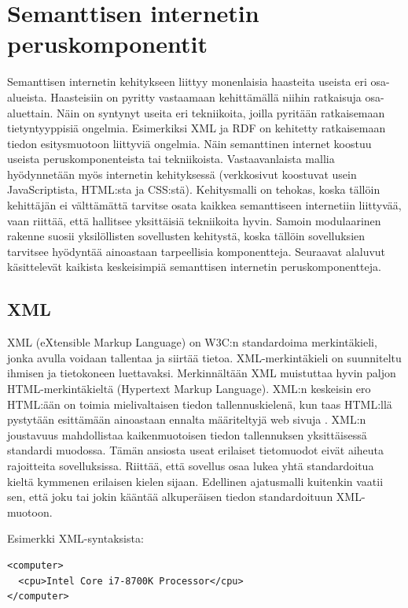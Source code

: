 \documentclass[finnish, 12pt, a4paper, elec, utf8, pdfa, online]{aaltothesis}
\begin{document}
\section{Semanttisen internetin peruskomponentit}
Semanttisen internetin kehitykseen liittyy monenlaisia haasteita useista eri osa-alueista. Haasteisiin on pyritty vastaamaan kehittämällä niihin ratkaisuja osa-aluettain. Näin on syntynyt useita eri tekniikoita, joilla pyritään ratkaisemaan tietyntyyppisiä ongelmia. Esimerkiksi XML ja RDF on kehitetty ratkaisemaan tiedon esitysmuotoon liittyviä ongelmia. Näin semanttinen internet koostuu useista peruskomponenteista tai tekniikoista. Vastaavanlaista mallia hyödynnetään myös internetin kehityksessä (verkkosivut koostuvat usein JavaScriptista, HTML:sta ja CSS:stä). Kehitysmalli on tehokas, koska tällöin kehittäjän ei välttämättä tarvitse osata kaikkea semanttiseen internetiin liittyvää, vaan riittää, että hallitsee yksittäisiä tekniikoita hyvin. Samoin modulaarinen rakenne suosii yksilöllisten sovellusten kehitystä, koska tällöin sovelluksien tarvitsee hyödyntää ainoastaan tarpeellisia komponentteja. Seuraavat alaluvut käsittelevät kaikista keskeisimpiä semanttisen internetin peruskomponentteja.


\subsection{XML}
XML (eXtensible Markup Language) on W3C:n standardoima merkintäkieli, jonka avulla voidaan tallentaa ja siirtää tietoa. XML-merkintäkieli on suunniteltu ihmisen ja tietokoneen luettavaksi. Merkinnältään XML muistuttaa hyvin paljon HTML-merkintäkieltä (Hypertext Markup Language). XML:n keskeisin ero HTML:ään on toimia mielivaltaisen tiedon tallennuskielenä, kun taas HTML:llä pystytään esittämään ainoastaan ennalta määriteltyjä web sivuja \cite{IEEE_XML}. XML:n joustavuus mahdollistaa kaikenmuotoisen tiedon tallennuksen yksittäisessä standardi muodossa. Tämän ansiosta useat erilaiset tietomuodot eivät aiheuta rajoitteita sovelluksissa. Riittää, että sovellus osaa lukea yhtä standardoitua kieltä kymmenen erilaisen kielen sijaan. Edellinen ajatusmalli kuitenkin vaatii sen, että joku tai jokin kääntää alkuperäisen tiedon standardoituun XML-muotoon.

Esimerkki XML-syntaksista:
\begin{lstlisting}[style=codeblock]
<computer>
  <cpu>Intel Core i7-8700K Processor</cpu>
</computer>
\end{lstlisting}
\end{document}
